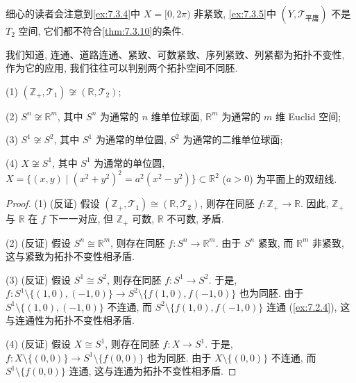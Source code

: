 细心的读者会注意到\cref{ex:7.3.4}中 $X = [0, 2\pi)$ 非紧致, \cref{ex:7.3.5}中 $(Y, \mathcal{T}_{\text{平庸}})$ 不是 $T_{2}$ 空间, 它们都不符合\cref{thm:7.3.10}的条件.

我们知道, 连通、道路连通、紧致、可数紧致、序列紧致、列紧都为拓扑不变性, 作为它的应用, 我们往往可以判别两个拓扑空间不同胚.

\begin{example}\label{ex:7.3.6}
(1) $(\mathbb{Z}_{+}, \mathcal{T}_{1}) \not\cong (\mathbb{R}, \mathcal{T}_{2})$;

(2) $S^{n} \not\cong \mathbb{R}^{m}$, 其中 $S^{n}$ 为通常的 $n$ 维单位球面, $\mathbb{R}^{m}$ 为通常的 $m$ 维 Euclid 空间;

(3) $S^{1} \not\cong S^{2}$, 其中 $S^{1}$ 为通常的单位圆, $S^{2}$ 为通常的二维单位球面;

(4) $X \not\cong S^{1}$, 其中 $S^{1}$ 为通常的单位圆, $X = \{(x, y) \mid (x^{2} + y^{2})^{2} = a^{2}(x^{2} - y^{2})\} \subset \mathbb{R}^{2}$ ($a > 0$) 为平面上的双纽线.
\end{example}

\begin{proof}
(1) (反证) 假设 $(\mathbb{Z}_{+}, \mathcal{T}_{1}) \cong (\mathbb{R}, \mathcal{T}_{2})$, 则存在同胚 $f\colon \mathbb{Z}_{+} \to \mathbb{R}$. 因此, $\mathbb{Z}_{+}$ 与 $\mathbb{R}$ 在 $f$ 下一一对应, 但 $\mathbb{Z}_{+}$ 可数, $\mathbb{R}$ 不可数, 矛盾.

(2) (反证) 假设 $S^{n} \cong \mathbb{R}^{m}$, 则存在同胚 $f\colon S^{n} \to \mathbb{R}^{m}$. 由于 $S^{n}$ 紧致, 而 $\mathbb{R}^{m}$ 非紧致, 这与紧致为拓扑不变性相矛盾.

(3) (反证) 假设 $S^{1} \cong S^{2}$, 则存在同胚 $f\colon S^{1} \to S^{2}$. 于是, $f\colon S^{1} \setminus \{(1, 0), (-1, 0)\} \to S^{2} \setminus \{f(1, 0), f(-1, 0)\}$ 也为同胚. 由于 $S^{1} \setminus \{(1, 0), (-1, 0)\}$ 不连通, 而 $S^{2} \setminus \{f(1, 0), f(-1, 0)\}$ 连通 (\cref{ex:7.2.4}), 这与连通性为拓扑不变性相矛盾.

(4) (反证) 假设 $X \cong S^{1}$, 则存在同胚 $f\colon X \to S^{1}$. 于是, $f\colon X \setminus \{(0, 0)\} \to S^{1} \setminus \{f(0, 0)\}$ 也为同胚. 由于 $X \setminus \{(0, 0)\}$ 不连通, 而 $S^{1} \setminus \{f(0, 0)\}$ 连通, 这与连通为拓扑不变性相矛盾.
\end{proof}


